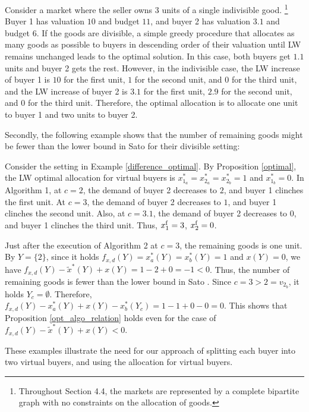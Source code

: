 \documentclass[letterpaper,11pt]{article}
\begin{document}
\begin{example}
\label{difference_optimal}
Consider a market where the seller owns 3 units of a single indivisible good.
\footnote{Throughout Section 4.4, the markets are represented by a complete bipartite graph with no constraints on the allocation of goods.}
Buyer 1 has valuation $10$ and budget $11$, and buyer 2 has valuation $3.1$ and budget $6$. If the goods are divisible, a simple greedy procedure that allocates as many goods as possible to buyers in descending order of their valuation until LW remains unchanged leads to the optimal solution. 
In this case, both buyers get $1.1$ units and buyer 2 gets the rest. 
However, in the indivisible case, the LW increase of buyer 1 is $10$ for the first unit, $1$ for the second unit, and $0$ for the third unit, 
and the LW increase of buyer 2 is $3.1$ for the first unit, $2.9$ for the second unit, and $0$ for the third unit.
Therefore, the optimal allocation is to allocate one unit to buyer 1 and two units to buyer 2.
\end{example}

Secondly, the following example shows that 
the number of remaining goods might be fewer than 
the lower bound in Sato \cite{S2023} for their divisible setting: 
\begin{example}
	Consider the setting in Example \ref{difference_optimal}.
	By Proposition \ref{optimal}, the LW optimal allocation for virtual buyers 
	is $x^{*}_{1_a}=x^{*}_{2_a}=x^{*}_{2_b}=1$ and $x^{*}_{1_b}=0$.
	In Algorithm 1, at $c=2$, the demand of buyer 2 decreases to $2$, and 
	buyer 1 clinches the first unit. At $c=3$, the demand of buyer 2 decreases to $1$, and 
	buyer 1 clinches the second unit.
	Also, at $c=3.1$, the demand of buyer 2 decreases to $0$, and 
	buyer 1 clinches the third unit. 
	Thus, $x^{\rm f}_{1}=3$, $x^{\rm f}_{2}=0$.
	
	Just after the execution of Algorithm 2 at $c=3$, 
	the remaining goods is one unit.
	By $Y=\{2\}$, since it holds $f_{x,d}(Y)=x_a^*(Y)=x_b^*(Y)=1$ and $x(Y)=0$, 
	we have  $f_{x,d}(Y)-\tilde{x}^*(Y)+x(Y)= 1-2+0=-1<0$. 
	Thus, the number of remaining goods is fewer than the lower bound in Sato \cite{S2023}.
	Since $c=3>2=v_{2_b}$, it holds $Y_c=\emptyset$. 
	Therefore, $f_{x,d}(Y)-x_a^*(Y)+x(Y)-x_b^*(Y_c)= 1-1+0-0=0$.
	This shows that Proposition \ref{opt_algo_relation} holds 
	even for the case of $f_{x,d}(Y)-\tilde{x}^*(Y)+x(Y)<0$.
\end{example}

These examples illustrate the need for our approach of splitting each buyer into two virtual buyers, 
and using the allocation for virtual buyers.
\end{document}
